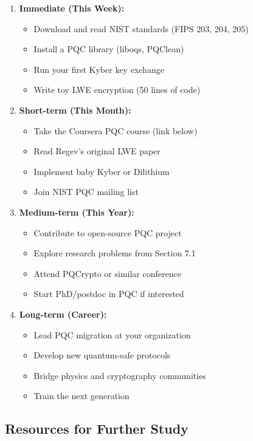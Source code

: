 \documentclass[11pt,a4paper]{article}
\begin{document}
\begin{enumerate}
    \item \textbf{Immediate (This Week):}
    \begin{itemize}
        \item Download and read NIST standards (FIPS 203, 204, 205)
        \item Install a PQC library (liboqs, PQClean)
        \item Run your first Kyber key exchange
        \item Write toy LWE encryption (50 lines of code)
    \end{itemize}
    
    \item \textbf{Short-term (This Month):}
    \begin{itemize}
        \item Take the Coursera PQC course (link below)
        \item Read Regev's original LWE paper
        \item Implement baby Kyber or Dilithium
        \item Join NIST PQC mailing list
    \end{itemize}
    
    \item \textbf{Medium-term (This Year):}
    \begin{itemize}
        \item Contribute to open-source PQC project
        \item Explore research problems from Section 7.1
        \item Attend PQCrypto or similar conference
        \item Start PhD/postdoc in PQC if interested
    \end{itemize}
    
    \item \textbf{Long-term (Career):}
    \begin{itemize}
        \item Lead PQC migration at your organization
        \item Develop new quantum-safe protocols
        \item Bridge physics and cryptography communities
        \item Train the next generation
    \end{itemize}
\end{enumerate}

\subsection{Resources for Further Study}
\end{document}
